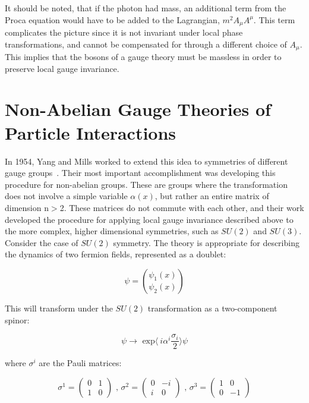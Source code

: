 \par It should be noted, that if the photon had mass, an additional
term from the Proca equation would have to be added to the Lagrangian,
$m^{2}A_{\mu}A^{\mu}$.  This term complicates the picture since it is
not invariant under local phase transformations, and cannot be
compensated for through a different choice of $A_{\mu}$.  This implies
that the bosons of a gauge theory must be massless in order to
preserve local gauge invariance.  


\section{Non-Abelian Gauge Theories of Particle Interactions}
\label{non_abelian_gauge_theory_overview}
\par In 1954, Yang and Mills worked to extend this idea to symmetries
of different gauge groups~\cite{th:Yang_Mills}.  Their most important
accomplishment was developing this procedure for non-abelian groups.
These are groups where the transformation does not involve a simple
variable $\alpha(x)$, but rather an entire matrix of dimension n$>$2.
These matrices do not commute with each other, and their work developed
the procedure for applying local gauge invariance described above to
the more complex, higher dimensional symmetries, such as $SU(2)$ and
$SU(3)$.  Consider the case of $SU(2)$ symmetry.  The theory is
appropriate for describing the dynamics of two fermion fields,
represented as a doublet:

\begin{equation}\label{eq:yang_mills_fermion_doublet}
\psi = \binom{\psi_{1}(x)}{\psi_{2}(x)}
\end{equation}

\noindent This will transform under the $SU(2)$ transformation as a
two-component spinor:

\begin{equation}\label{eq:yang_mills_fermion_transformaiton}
\psi \rightarrow \text{ exp}\langle~i\alpha^{i}\frac{\sigma_{i}}{2}\rangle\psi
\end{equation} 

\noindent where $\sigma^{i}$ are the Pauli matrices:

\begin{equation}\label{eq:pauli_matrices}
\sigma^{1} = 
  \begin{pmatrix}
    0  &  1 \\
    1  &  0
  \end{pmatrix}
\text{   ,    }
\sigma^{2} = 
  \begin{pmatrix}
    0  & -i \\
    i  &  0
  \end{pmatrix}
\text{   ,   }
\sigma^{3} = 
  \begin{pmatrix}
    1  &   0 \\
    0  & -1
  \end{pmatrix}
\end{equation}

